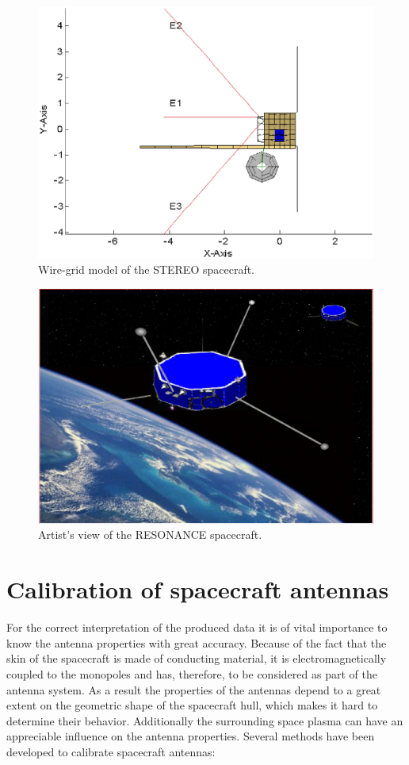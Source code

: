 \documentclass[a4paper,twocolumn]{esapub2005} %
\begin{document}
\begin{figure}
\centering
  \includegraphics[width=1.0\linewidth]{paperpics/stero_wiregrid.eps}
\caption{Wire-grid model of the STEREO spacecraft.\label{fig:wiregrid}}
\end{figure}

\begin{figure}
\centering
  \includegraphics[width=1.0\linewidth]{paperpics/resonance.eps}
\caption{Artist's view of the RESONANCE spacecraft.\label{fig:resonance}}
\end{figure}

\section{Calibration of spacecraft antennas}
For the correct interpretation of the produced data it is of vital importance to know the antenna properties with great accuracy. Because of the fact that the skin of the spacecraft is made of conducting material, it is electromagnetically coupled to the monopoles and has, therefore, to be considered as part of the antenna system. As a result the properties of the antennas depend to a great extent on the geometric shape of the spacecraft hull, which makes it hard to determine their behavior. Additionally the surrounding space plasma can have an appreciable influence on the antenna properties. Several methods have been developed to calibrate spacecraft antennas:
\end{document}
